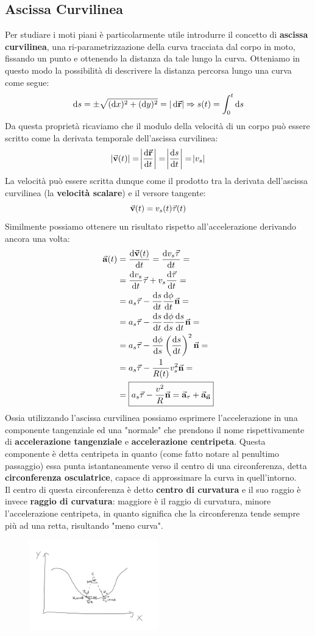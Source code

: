 \documentclass{report}
\newcommand{\then}{\ensuremath{\Rightarrow}}
\renewcommand{\a}{\va{a}}
\renewcommand{\v}{\va{v}}
\renewcommand{\r}{\va{r}}
\begin{document}
\subsection{Ascissa Curvilinea}
Per studiare i moti piani è particolarmente utile introdurre il concetto di \textbf{ascissa curvilinea}, una ri-parametrizzazione della curva tracciata dal corpo in moto, fissando un punto e ottenendo la distanza da tale lungo la curva. Otteniamo in questo modo la possibilità di descrivere la distanza percorsa lungo una curva come segue:
\[\dif s=\pm\sqrt{(\dif x)^2+(\dif y)^2}=|\dif\r|\then s(t)=\int_0^t\dif s\]
Da questa proprietà ricaviamo che il modulo della velocità di un corpo può essere scritto come la derivata temporale dell'ascissa curvilinea:
\[|\v(t)|=\abs{\dv{\r}{t}}=\abs{\dv{s}{t}}=\abs{v_s}\]
La velocità può essere scritta dunque come il prodotto tra la derivata dell'ascissa curvilinea (la \textbf{velocità scalare}) e il versore tangente:
\[\v(t)=v_s(t)\va{\tau}(t)\]
Similmente possiamo ottenere un risultato rispetto all'accelerazione derivando ancora una volta:
\begin{equation}
\begin{split}
  \a(t)&=\dv{\v(t)}{t}=\dv{v_s\va{\tau}}{t}=\\
  &=\dv{v_s}{t}\va{\tau}+v_s\dv{\va{\tau}}{t}=\\
  &=a_s\va{\tau}-\dv{s}{t}\dv{\phi}{t}\va{n}=\\
  &=a_s\va{\tau}-\dv{s}{t}\dv{\phi}{s}\dv{s}{t}\va{n}=\\
  &=a_s\va{\tau}-\dv{\phi}{s}\left(\dv{s}{t}\right)^2\va{n}=\\
  &=a_s\va{\tau}-\frac{1}{R(t)}v_s^2\va{n}=\\
  &=\boxed{a_s\va{\tau}-\frac{v^2}{R}\va{n}=\a_{\tau}+\a_{\va{n}}}
\end{split}
\end{equation}
Ossia utilizzando l'ascissa curvilinea possiamo esprimere l'accelerazione in una componente tangenziale ed una "normale" che prendono il nome rispettivamente di \textbf{accelerazione tangenziale} e \textbf{accelerazione centripeta}. Questa componente è detta centripeta in quanto (come fatto notare al penultimo passaggio) essa punta istantaneamente verso il centro di una circonferenza, detta \textbf{circonferenza osculatrice}, capace di approssimare la curva in quell'intorno.\\
Il centro di questa circonferenza è detto \textbf{centro di curvatura} e il suo raggio è invece \textbf{raggio di curvatura}: maggiore è il raggio di curvatura, minore l'accelerazione centripeta, in quanto significa che la circonferenza tende sempre più ad una retta, risultando "meno curva".
\begin{figure}[H]
    \centering
    \includegraphics[width=0.5\textwidth]{CircOscul.png}
\end{figure}
\end{document}

